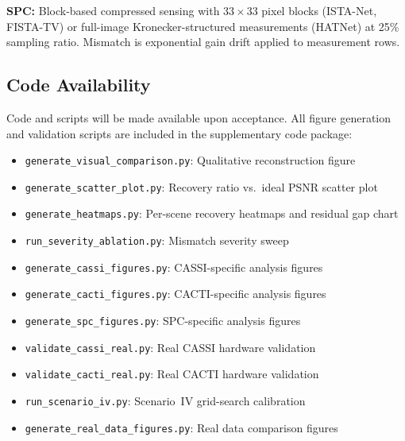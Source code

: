 \documentclass[runningheads]{llncs}
\begin{document}
\textbf{SPC:} Block-based compressed sensing with $33 \times 33$ pixel blocks (ISTA-Net, FISTA-TV) or full-image Kronecker-structured measurements (HATNet) at 25\% sampling ratio. Mismatch is exponential gain drift applied to measurement rows.

\subsection{Code Availability}

Code and scripts will be made available upon acceptance.
All figure generation and validation scripts are included in the supplementary code package:
\begin{itemize}
    \item \texttt{generate\_visual\_comparison.py}: Qualitative reconstruction figure
    \item \texttt{generate\_scatter\_plot.py}: Recovery ratio vs.\ ideal PSNR scatter plot
    \item \texttt{generate\_heatmaps.py}: Per-scene recovery heatmaps and residual gap chart
    \item \texttt{run\_severity\_ablation.py}: Mismatch severity sweep
    \item \texttt{generate\_cassi\_figures.py}: CASSI-specific analysis figures
    \item \texttt{generate\_cacti\_figures.py}: CACTI-specific analysis figures
    \item \texttt{generate\_spc\_figures.py}: SPC-specific analysis figures
    \item \texttt{validate\_cassi\_real.py}: Real CASSI hardware validation
    \item \texttt{validate\_cacti\_real.py}: Real CACTI hardware validation
    \item \texttt{run\_scenario\_iv.py}: Scenario~IV grid-search calibration
    \item \texttt{generate\_real\_data\_figures.py}: Real data comparison figures
\end{itemize}
\end{document}

